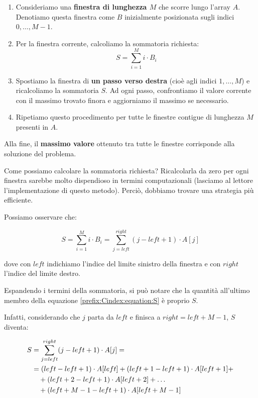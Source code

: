 \begin{enumerate}
	\item Consideriamo una \textbf{finestra di lunghezza \(M\)} che scorre lungo l'array \(A\).  
	Denotiamo questa finestra come \(B\) inizialmente posizionata sugli indici \(0, \dots, M-1\).
	
	\item Per la finestra corrente, calcoliamo la sommatoria richiesta:
	\begin{equation}
		S = \sum_{i=1}^{M} i \cdot B_i
	\end{equation}
	
	\item Spostiamo la finestra di \textbf{un passo verso destra} (cioè agli indici \(1, \dots, M\)) e ricalcoliamo la sommatoria \(S\).  
	Ad ogni passo, confrontiamo il valore corrente con il massimo trovato finora e aggiorniamo il massimo se necessario.
	
	\item Ripetiamo questo procedimento per tutte le finestre contigue di lunghezza \(M\) presenti in \(A\).
\end{enumerate}

Alla fine, il \textbf{massimo valore} ottenuto tra tutte le finestre corrisponde alla soluzione del problema.

Come possiamo calcolare la sommatoria richiesta?  
Ricalcolarla da zero per ogni finestra sarebbe molto dispendioso in termini computazionali (lasciamo al lettore l'implementazione di questo metodo).  
Perciò, dobbiamo trovare una strategia più efficiente.

Possiamo osservare che:

\begin{equation}
	\label{prefix:Cindex:equation:S}
	S = \sum_{i=1}^{M} i \cdot B_i = \sum_{j = left}^{right} (j - left + 1) \cdot A[j]
\end{equation}

dove con \(left\) indichiamo l'indice del limite sinistro della finestra e con \(right\) l'indice del limite destro.

Espandendo i termini della sommatoria, si può notare che la quantità all'ultimo membro della equazione \ref{prefix:Cindex:equation:S} è proprio $S$.

Infatti, considerando che $j$ parta da $left$ e finisca a $right = left+M-1$, $S$ diventa:


\begin{align}
	S &= \sum_{j = left}^{right} (j - left + 1) \cdot A[j] = \\
	&= (left - left + 1) \cdot A[left] 
	+ (left + 1 - left + 1) \cdot A[left+1] + \notag \\
	&\quad + (left + 2 - left + 1) \cdot A[left+2] 
	+ \dots \notag \\
	&\quad + (left + M - 1 - left + 1) \cdot A[left + M - 1] \notag
\end{align}

